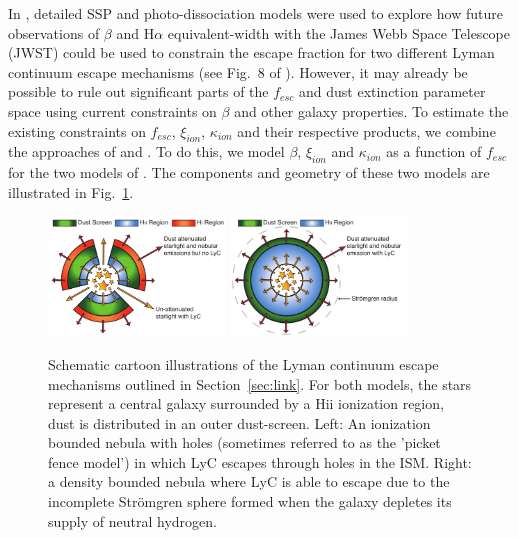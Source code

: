 In \citet{Zackrisson:2013iz}, detailed SSP and photo-dissociation models were used to explore how future observations of $\beta$ and H$\alpha$ equivalent-width with the James Webb Space Telescope (JWST) could be used to constrain the escape fraction for two different Lyman continuum escape mechanisms (see Fig.~8 of \citet{Zackrisson:2013iz}). However, it may already be possible to rule out significant parts of the $f_{esc}$ and dust extinction parameter space using current constraints on $\beta$ and other galaxy properties. To estimate the existing constraints on $f_{esc}$, $\xi_{ion}$, $\kappa_{ion}$ and their respective products, we combine the approaches of \citet{Zackrisson:2013iz} and \citet{2010Natur.468...49R, Robertson:2013ji}. To do this, we model $\beta$, $\xi_{ion}$ and $\kappa_{ion}$ as a function of $f_{esc}$ for the two models of \citet{Zackrisson:2013iz}. The components and geometry of these two models are illustrated in Fig.~\ref{fig:mechanisms}.

\begin{figure}
\centering
  \includegraphics[width=0.42\textwidth]{plots/Fig1a.pdf}
  \quad \quad \quad \quad \quad
  \includegraphics[width=0.42\textwidth]{plots/Fig1b.pdf}

  \caption{Schematic cartoon illustrations of the Lyman continuum escape mechanisms outlined in Section~\ref{sec:link}. For both models, the stars represent a central galaxy surrounded by a {\sc Hii} ionization region, dust is distributed in an outer dust-screen. Left: An ionization bounded nebula with holes (sometimes referred to as the 'picket fence model') in which LyC escapes through holes in the ISM. Right: a density bounded nebula where LyC is able to escape due to the incomplete Str{\"o}mgren sphere formed when the galaxy depletes its supply of neutral hydrogen.}
  \label{fig:mechanisms}
\end{figure}

